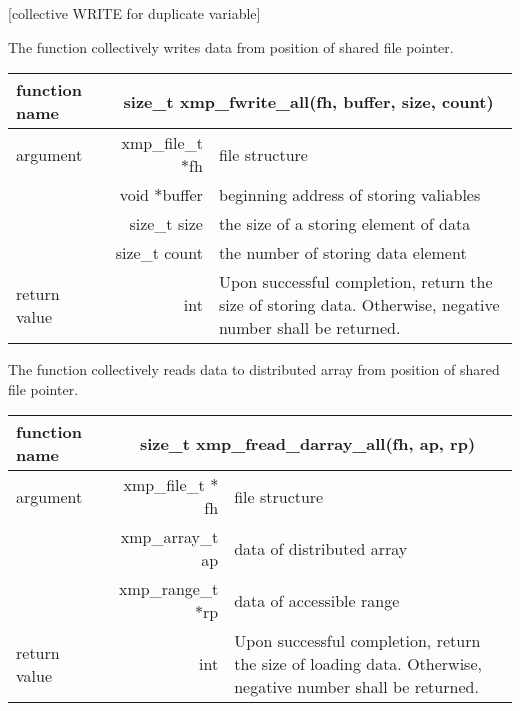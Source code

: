    [collective WRITE for duplicate variable]

   The function collectively writes data from position of shared file
   pointer.

   \begin{table}[h]
    \begin{center}
     \begin{tabular}{|l|r|p{80mm}|}
      \hline
      {\bf function name}  & \multicolumn{2}{c|}{\bf size\_t
      xmp\_fwrite\_all(fh, buffer, size, count)}  \\ \hline \hline
      argument & xmp\_file\_t $*$fh & file structure \\ \cline{2-3}
      & void $*$buffer & beginning address of storing valiables \\ \cline{2-3}
      & size\_t size & the size of a storing element of data \\ \cline{2-3}
      & size\_t count & the number of storing data element \\ \hline
      return value & int & Upon successful completion, return the size
	      of storing data. Otherwise, negative number shall be
	      returned. \\ \hline
      \end{tabular}
     \end{center}
    \label{tb:aaa}
   \end{table}


   The function collectively reads data to distributed array from
   position of shared file pointer.

   \begin{table}[h]
    \begin{center}
     \begin{tabular}{|l|r|p{80mm}|}
      \hline
      {\bf function name}  & \multicolumn{2}{c|}{\bf size\_t
      xmp\_fread\_darray\_all(fh, ap, rp)} \\ \hline
      argument & xmp\_file\_t $*$fh & file structure \\ \cline{2-3}
      & xmp\_array\_t ap & data of distributed array \\ \cline{2-3}
      & xmp\_range\_t $*$rp & data of accessible range \\ \hline
      return value & int & Upon successful completion, return the size
	      of loading data. Otherwise, negative number shall be
	      returned. \\ \hline
      \end{tabular}
     \end{center}
    \label{tb:aaa}
   \end{table}

